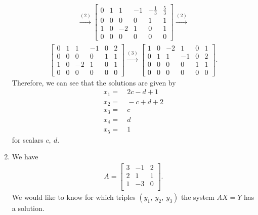 \documentclass[12pt]{article}
\begin{document}
\begin{enumerate}
\begin{align*}
      \xrightarrow{(2)}
      \begin{bmatrix}
        0 & 1 & 1  & -1 & -\frac{1}{3} & \frac{5}{3}\\
        0 & 0 & 0  & 0  & 1            & 1\\
        1 & 0 & -2 & 1  & 0            & 1\\
        0 & 0 & 0  & 0  & 0            & 0
      \end{bmatrix}
      \xrightarrow{(2)}
    \end{align*}
    \begin{align*}
      \begin{bmatrix}
        0 & 1 & 1  & -1 & 0 & 2\\
        0 & 0 & 0  & 0  & 1 & 1\\
        1 & 0 & -2 & 1  & 0 & 1\\
        0 & 0 & 0  & 0  & 0 & 0
      \end{bmatrix}
      \xrightarrow{(3)}
      \begin{bmatrix}
        1 & 0 & -2 & 1  & 0 & 1\\
        0 & 1 & 1  & -1 & 0 & 2\\
        0 & 0 & 0  & 0  & 1 & 1\\
        0 & 0 & 0  & 0  & 0 & 0
      \end{bmatrix}.
    \end{align*}
    Therefore, we can see that the solutions are given by
    \begin{align*}
      x_1 =&\ 2c - d + 1\\
      x_2 =&\ -c + d + 2\\
      x_3 =&\ c\\
      x_4 =&\ d\\
      x_5 =&\ 1
    \end{align*}
    for scalars $c,\ d$.

  \item
    We have
    \begin{align*}
      A =
      \begin{bmatrix}
        3 & -1 & 2\\
        2 & 1  & 1\\
        1 & -3 & 0\\
      \end{bmatrix}.
    \end{align*}
    We would like to know for which triples $(y_1,\ y_2,\ y_3)$
    the system $AX = Y$ has a solution.


\end{enumerate}
\end{document}
